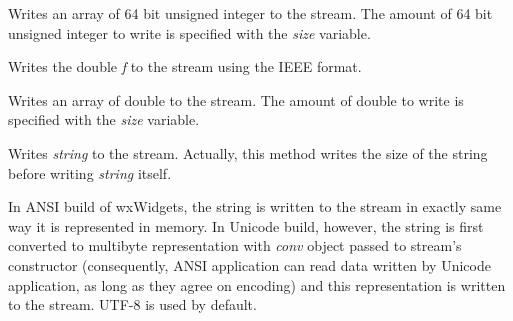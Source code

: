 
Writes an array of 64 bit unsigned integer to the stream. The amount of
64 bit unsigned integer to write is specified with the {\it size} variable.

\label{wxdataoutputstreamwritedouble}


Writes the double {\it f} to the stream using the IEEE format.


Writes an array of double to the stream. The amount of double to write is
specified with the {\it size} variable.

\label{wxdataoutputstreamwritestring}


Writes {\it string} to the stream. Actually, this method writes the size of
the string before writing {\it string} itself.

In ANSI build of wxWidgets, the string is written to the stream in exactly
same way it is represented in memory. In Unicode build, however, the string
is first converted to multibyte representation with {\it conv} object passed
to stream's constructor (consequently, ANSI application can read data 
written by Unicode application, as long as they agree on encoding) and this
representation is written to the stream. UTF-8 is used by default.

